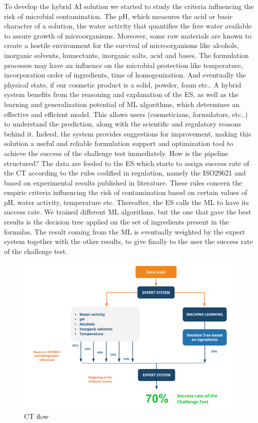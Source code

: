 \documentclass[a4paper,12pt,twoside]{report}
\begin{document}
To develop the hybrid AI solution we started to study the criteria influencing the risk of microbial contamination. The pH, which measures the acid or basic character of a solution, the water activity that quantifies the free water available to assure growth of microorganisms. Moreover, some raw materials are known to create a hostile environment for the survival of microorganisms like alcohols, inorganic solvents, humectants, inorganic salts, acid and bases. The formulation processes may have an influence on the microbial protection like temperature, incorporation order of ingredients, time of homogenization. And eventually the physical state, if our cosmetic product is a solid, powder, foam etc..
A hybrid system benefits from the reasoning and explanation of the ES, as well as the learning and generalization potential of ML algorithms, which determines an effective and efficient model. 
This allows users (cosmeticians, formulators, etc..) to understand the prediction, along with the scientific and regulatory reasons behind it. Indeed, the system provides suggestions for improvement, making this solution a useful and reliable formulation support and optimization tool to achieve the success of the challenge test immediately. 
How is the pipeline structured? The data are feeded to the ES which starts to assign success rate of the CT according to the rules codified in regulation, namely the ISO29621 and based on experimental results published in literature. These rules concern the empiric criteria influencing the risk of contamination based on certain values of pH, water activity, temperature etc. 
Thereafter, the ES calls the ML to have its success rate. We trained different ML algorithms, but the one that gave the best results is the decision tree applied on the set of ingredients present in the formulas. The result coming from the ML is eventually weighted by the expert system together with the other results, to give finally to the user the success rate of the challenge test.

\begin{figure}
		\includegraphics[width=\textwidth]{images/ctFlow}
	\caption[WorkFlow of CT prediction in CF]{CT flow}
\end{figure}
\end{document}
